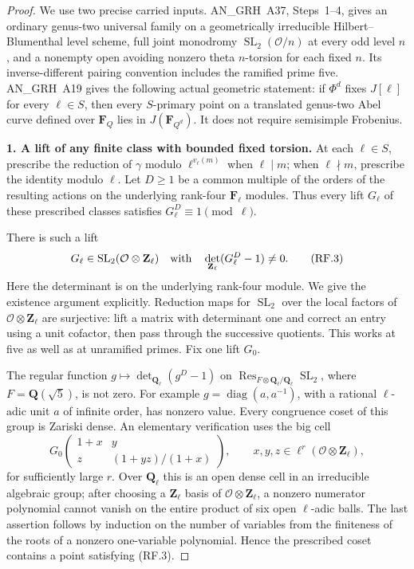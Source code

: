 \documentclass[11pt,a4paper]{article}
\theoremstyle{definition}
\renewcommand{\paragraph}[1]{\par\smallskip\noindent\textbf{#1}\quad\ignorespaces}
\begin{document}
\begin{proof}
We use two precise carried inputs.  AN\_GRH~A37, Steps~1--4,
gives an ordinary genus-two universal family on a geometrically
irreducible Hilbert--Blumenthal level scheme, full joint monodromy
$\operatorname{SL}_2(\mathcal O/n)$ at every odd level $n$, and
a nonempty open avoiding nonzero theta $n$-torsion for each fixed
$n$.  Its inverse-different pairing convention includes the
ramified prime five.  AN\_GRH~A19 gives the following actual
geometric statement: if $\Phi^d$ fixes $J[\ell]$ for every
$\ell\in S$, then every $S$-primary point on a translated genus-two
Abel curve defined over $\mathbf F_Q$ lies in
$J(\mathbf F_{Q^d})$.  It does not require semisimple Frobenius.

\paragraph{1. A lift of any finite class with bounded fixed torsion.}
At each $\ell\in S$, prescribe the reduction of $\gamma$ modulo
$\ell^{v_\ell(m)}$ when $\ell\mid m$; when $\ell\nmid m$,
prescribe the identity modulo $\ell$.  Let $D\geq1$ be a common
multiple of the orders of the resulting actions on the underlying
rank-four $\mathbf F_\ell$ modules.  Thus every lift $G_\ell$
of these prescribed classes satisfies $G_\ell^D\equiv1\pmod\ell$.

There is such a lift
\[
 G_\ell\in\operatorname{SL}_2(\mathcal O\otimes\mathbf Z_\ell)
 \quad\hbox{with}\quad
             \det_{\mathbf Z_\ell}(G_\ell^D-1)\ne0.          \tag{RF.3}
\]
Here the determinant is on the underlying rank-four module.
We give the existence argument explicitly.  Reduction maps for
$\operatorname{SL}_2$ over the local factors of
$\mathcal O\otimes\mathbf Z_\ell$ are surjective: lift a matrix
with determinant one and correct an entry using a unit cofactor,
then pass through the successive quotients.  This works at five
as well as at unramified primes.  Fix one lift $G_0$.

The regular function
$g\mapsto\det_{\mathbf Q_\ell}(g^D-1)$ on
$\operatorname{Res}_{F\otimes\mathbf Q_\ell/\mathbf Q_\ell}
\operatorname{SL}_2$, where $F=\mathbf Q(\sqrt5)$, is not zero.
For example $g=\operatorname{diag}(a,a^{-1})$, with a rational
$\ell$-adic unit $a$ of infinite order, has nonzero value.
Every congruence coset of this group is Zariski dense.  An
elementary verification uses the big cell
\[
 G_0\begin{pmatrix}
       1+x&y\\ z&(1+yz)/(1+x)
     \end{pmatrix},\qquad
 x,y,z\in\ell^r(\mathcal O\otimes\mathbf Z_\ell),             \tag{RF.4}
\]
for sufficiently large $r$.  Over $\mathbf Q_\ell$ this is an
open dense cell in an irreducible algebraic group; after choosing
a $\mathbf Z_\ell$ basis of $\mathcal O\otimes\mathbf Z_\ell$,
a nonzero numerator polynomial cannot vanish on the entire
product of six open $\ell$-adic balls.  The last assertion follows
by induction on the number of variables from the finiteness of
the roots of a nonzero one-variable polynomial.  Hence the
prescribed coset contains a point satisfying (RF.3).


\end{proof}
\end{document}

